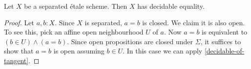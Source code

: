 \begin{proposition}%
	Let $X$ be a separated \'{e}tale scheme. Then $X$ has decidable equality.
\end{proposition}

\begin{proof}
	Let $a, b : X$. Since $X$ is separated, $a = b$ is closed.
	We claim it is also open.
	To see this, pick an affine open neighbourhood $U$ of $a$.
	Now $a = b$ is equivalent to $(b \in U) \wedge (a = b)$.
	Since open propositions are closed under $\Sigma$,
	it suffices to show that $a = b$ is open assuming $b \in U$.
	In this case we can apply \cref{decidable-of-tangent}.
\end{proof}
